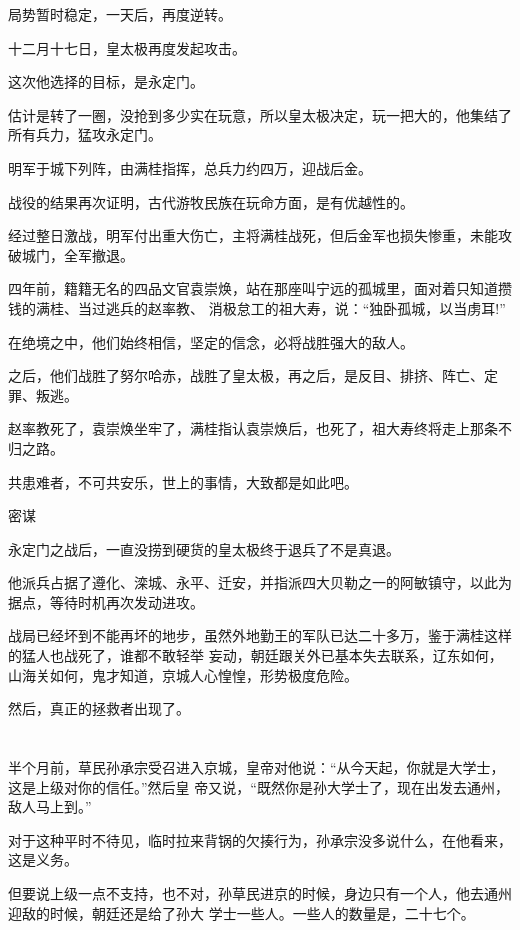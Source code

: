 \documentclass[11pt,a4paper,onecolumn]{article}
\begin{document}
局势暂时稳定，一天后，再度逆转。

十二月十七日，皇太极再度发起攻击。

这次他选择的目标，是永定门。

估计是转了一圈，没抢到多少实在玩意，所以皇太极决定，玩一把大的，他集结了所有兵力，猛攻永定门。

明军于城下列阵，由满桂指挥，总兵力约四万，迎战后金。

战役的结果再次证明，古代游牧民族在玩命方面，是有优越性的。

经过整日激战，明军付出重大伤亡，主将满桂战死，但后金军也损失惨重，未能攻破城门，全军撤退。

四年前，籍籍无名的四品文官袁崇焕，站在那座叫宁远的孤城里，面对着只知道攒钱的满桂、当过逃兵的赵率教、
消极怠工的祖大寿，说：``独卧孤城，以当虏耳!''

在绝境之中，他们始终相信，坚定的信念，必将战胜强大的敌人。

之后，他们战胜了努尔哈赤，战胜了皇太极，再之后，是反目、排挤、阵亡、定罪、叛逃。

赵率教死了，袁崇焕坐牢了，满桂指认袁崇焕后，也死了，祖大寿终将走上那条不归之路。

共患难者，不可共安乐，世上的事情，大致都是如此吧。

密谋

永定门之战后，一直没捞到硬货的皇太极终于退兵了\myrule 不是真退。

他派兵占据了遵化、滦城、永平、迁安，并指派四大贝勒之一的阿敏镇守，以此为据点，等待时机再次发动进攻。

战局已经坏到不能再坏的地步，虽然外地勤王的军队已达二十多万，鉴于满桂这样的猛人也战死了，谁都不敢轻举
妄动，朝廷跟关外已基本失去联系，辽东如何，山海关如何，鬼才知道，京城人心惶惶，形势极度危险。

然后，真正的拯救者出现了。

\section[\thesection]{}

半个月前，草民孙承宗受召进入京城，皇帝对他说：``从今天起，你就是大学士，这是上级对你的信任。''然后皇
帝又说，``既然你是孙大学士了，现在出发去通州，敌人马上到。''

对于这种平时不待见，临时拉来背锅的欠揍行为，孙承宗没多说什么，在他看来，这是义务。

但要说上级一点不支持，也不对，孙草民进京的时候，身边只有一个人，他去通州迎敌的时候，朝廷还是给了孙大
学士一些人。一些人的数量是，二十七个。
\end{document}
